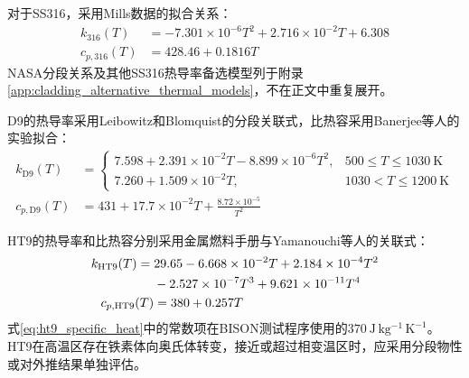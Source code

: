 对于SS316，采用Mills数据的拟合关系\cite{mills2002,halesBISONTheoryManual2016}：
\begin{subequations}\label{eq:ss316_thermal_properties}
	\begin{align}
		k_{316}(T)
		&=-7.301\times10^{-6}T^2
		+2.716\times10^{-2}T+6.308
		\label{eq:ss316_thermal_conductivity}\\
		c_{p,316}(T)
		&=428.46+0.1816T
		\label{eq:ss316_specific_heat}
	\end{align}
\end{subequations}
NASA分段关系及其他SS316热导率备选模型列于附录\ref{app:cladding_alternative_thermal_models}，不在正文中重复展开。

D9的热导率采用Leibowitz和Blomquist的分段关联式，比热容采用Banerjee等人的实验拟合\cite{Leibowitz_1988,banerjee2007_d9cp}：
\begin{subequations}\label{eq:d9_thermal_properties}
	\begin{align}
		k_{\mathrm{D9}}(T)
		&=
		\begin{cases}
			7.598+2.391\times10^{-2}T-8.899\times10^{-6}T^2,
			&500\leq T\leq1030\ \mathrm{K}\\
			7.260+1.509\times10^{-2}T,
			&1030<T\leq1200\ \mathrm{K}
		\end{cases}
		\label{eq:d9_thermal_conductivity}\\
		c_{p,\mathrm{D9}}(T)
		&=431+17.7\times10^{-2}T
		+\frac{8.72\times10^{-5}}{T^2}
		\label{eq:d9_specific_heat}
	\end{align}
\end{subequations}

HT9的热导率和比热容分别采用金属燃料手册与Yamanouchi等人的关联式\cite{hofmanMetallicFuelsHandbook2019,Yamanouchi_1992}：
\begin{subequations}\label{eq:ht9_thermal_properties}
	\begin{align}
		k_{\mathrm{HT9}}(T)
		={}&29.65-6.668\times10^{-2}T
		+2.184\times10^{-4}T^2
		\notag\\
		&-2.527\times10^{-7}T^3
		+9.621\times10^{-11}T^4
		\label{eq:ht9_thermal_conductivity}\\
		c_{p,\mathrm{HT9}}(T)
		&=380+0.257T
		\label{eq:ht9_specific_heat}
	\end{align}
\end{subequations}
式\eqref{eq:ht9_specific_heat}中的常数项在BISON测试程序使用的$370\ \mathrm{J\,kg^{-1}\,K^{-1}}$。HT9在高温区存在铁素体向奥氏体转变，接近或超过相变温区时，应采用分段物性或对外推结果单独评估。

